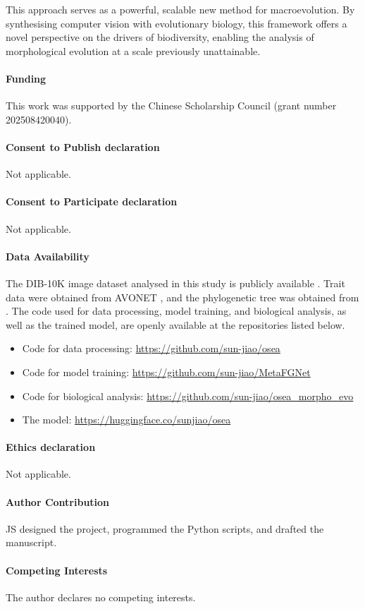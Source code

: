 \documentclass[pdflatex]{sn-jnl}
\begin{document}
This approach serves as a powerful, scalable new method for macroevolution.
By synthesising computer vision with evolutionary biology,
this framework offers a novel perspective on the drivers of biodiversity,
enabling the analysis of morphological evolution at a scale previously unattainable.

\paragraph{Funding}

This work was supported by the Chinese Scholarship Council (grant number 202508420040).

\paragraph{Consent to Publish declaration}

Not applicable.

\paragraph{Consent to Participate declaration}

Not applicable.

\paragraph{Data Availability}

The DIB-10K image dataset analysed in this study is publicly available \parencite{Mei2020Dongniao}. Trait data were obtained from AVONET \parencite{tobias2022avonet}, and the phylogenetic tree was obtained from \textcite{Stiller2024Complexity}. The code used for data processing, model training, and biological analysis, as well as the trained model, are openly available at the repositories listed below.
\begin{itemize}
    \item Code for data processing: \url{https://github.com/sun-jiao/osea}
    \item Code for model training: \url{https://github.com/sun-jiao/MetaFGNet}
    \item Code for biological analysis: \url{https://github.com/sun-jiao/osea_morpho_evo}
    \item The model: \url{https://huggingface.co/sunjiao/osea}
\end{itemize}

\paragraph{Ethics declaration}

Not applicable.

\paragraph{Author Contribution}

JS designed the project, programmed the Python scripts, and drafted the manuscript.

\paragraph{Competing Interests}

The author declares no competing interests.

\printbibliography
\end{document}
